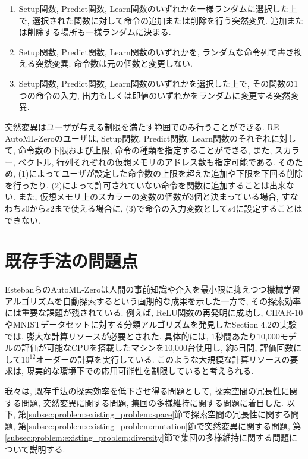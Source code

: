 \documentclass[11pt,oneside,openany,report]{jsbook}
\begin{document}
\begin{enumerate}
  \renewcommand{\labelenumi}{(\arabic{enumi})}
  \item Setup関数, Predict関数, Learn関数のいずれかを一様ランダムに選択した上で, 選択された関数に対して命令の追加または削除を行う突然変異. 追加または削除する場所も一様ランダムに決まる.
  \item Setup関数, Predict関数, Learn関数のいずれかを, ランダムな命令列で書き換える突然変異. 命令数は元の個数と変更しない.
  \item Setup関数, Predict関数, Learn関数のいずれかを選択した上で, その関数の1つの命令の入力, 出力もしくは即値のいずれかをランダムに変更する突然変異.
\end{enumerate}
\noindent
突然変異はユーザが与える制限を満たす範囲でのみ行うことができる. RE-AutoML-Zeroのユーザは, Setup関数, Predict関数, Learn関数のそれぞれに対して, 命令数の下限および上限, 命令の種類を指定することができる, また, スカラー, ベクトル, 行列それぞれの仮想メモリのアドレス数も指定可能である. そのため, (1)によってユーザが設定した命令数の上限を超えた追加や下限を下回る削除を行ったり, (2)によって許可されていない命令を関数に追加することは出来ない. また, 仮想メモリ上のスカラーの変数の個数が3個と決まっている場合, すなわち$s0$から$s2$まで使える場合に, (3)で命令の入力変数として$s4$に設定することはできない.

\section{既存手法の問題点}\label{sec:problem:existing_problem}

EstebanらのAutoML-Zeroは人間の事前知識や介入を最小限に抑えつつ機械学習アルゴリズムを自動探索するという画期的な成果を示した一方で, その探索効率には重要な課題が残されている. 例えば, ReLU関数の再発明に成功し, CIFAR-10やMNISTデータセットに対する分類アルゴリズムを発見したSection 4.2の実験では, 膨大な計算リソースが必要とされた. 具体的には, 1秒間あたり10,000モデルの評価が可能なCPUを搭載したマシンを10,000台使用し, 約5日間, 評価回数にして$10^{12}$オーダーの計算を実行している. このような大規模な計算リソースの要求は, 現実的な環境下での応用可能性を制限していると考えられる.

我々は, 既存手法の探索効率を低下させ得る問題として, 探索空間の冗長性に関する問題, 突然変異に関する問題, 集団の多様維持に関する問題に着目した. 以下, 第\ref{subsec:problem:existing_problem:space}節で探索空間の冗長性に関する問題, 第\ref{subsec:problem:existing_problem:mutation}節で突然変異に関する問題, 第\ref{subsec:problem:existing_problem:diversity}節で集団の多様維持に関する問題について説明する.
\end{document}
